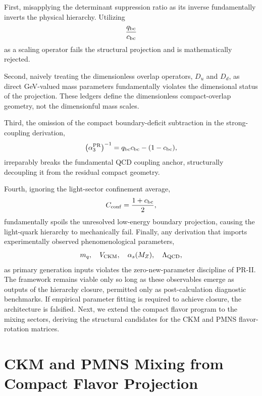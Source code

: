 \documentclass[11pt]{article}
\begin{document}
First, misapplying the determinant suppression ratio as its inverse fundamentally inverts the physical hierarchy. Utilizing
\begin{equation}
\frac{q_{\rm bc}}{c_{\rm bc}}
\end{equation}
as a scaling operator fails the structural projection and is mathematically rejected.

Second, naively treating the dimensionless overlap operators, \(D_u\) and \(D_d\), as direct GeV-valued mass parameters fundamentally violates the dimensional status of the projection. These ledgers define the dimensionless compact-overlap geometry, not the dimensionful mass scales.

Third, the omission of the compact boundary-deficit subtraction in the strong-coupling derivation,
\begin{equation}
\left(\alpha_3^{\rm PR}\right)^{-1}
=
q_{\rm bc}c_{\rm bc}
-
(1-c_{\rm bc}),
\end{equation}
irreparably breaks the fundamental QCD coupling anchor, structurally decoupling it from the residual compact geometry.

Fourth, ignoring the light-sector confinement average,
\begin{equation}
C_{\rm conf}
=
\frac{1+c_{\rm bc}}{2},
\end{equation}
fundamentally spoils the unresolved low-energy boundary projection, causing the light-quark hierarchy to mechanically fail. Finally, any derivation that imports experimentally observed phenomenological parameters,
\begin{equation}
m_q,
\quad
V_{\rm CKM},
\quad
\alpha_s(M_Z),
\quad
\Lambda_{\rm QCD},
\end{equation}
as primary generation inputs violates the zero-new-parameter discipline of PR-II. The framework remains viable only so long as these observables emerge as outputs of the hierarchy closure, permitted only as post-calculation diagnostic benchmarks. If empirical parameter fitting is required to achieve closure, the architecture is falsified. Next, we extend the compact flavor program to the mixing sectors, deriving the structural candidates for the CKM and PMNS flavor-rotation matrices.


\section{CKM and PMNS Mixing from Compact Flavor Projection}
\label{sec:pr2_ckm_pmns_flavor_projection}
\end{document}
